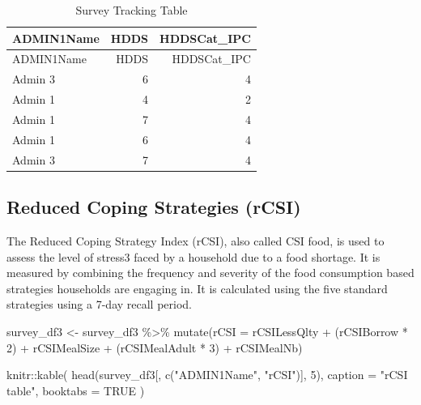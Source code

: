\documentclass[
  letterpaper,
  DIV=11,
  numbers=noendperiod]{scrreprt}
\newenvironment{Shaded}{\begin{snugshade}}{\end{snugshade}}
\newcommand{\AttributeTok}[1]{\textcolor[rgb]{0.40,0.45,0.13}{#1}}
\newcommand{\ConstantTok}[1]{\textcolor[rgb]{0.56,0.35,0.01}{#1}}
\newcommand{\DecValTok}[1]{\textcolor[rgb]{0.68,0.00,0.00}{#1}}
\newcommand{\FunctionTok}[1]{\textcolor[rgb]{0.28,0.35,0.67}{#1}}
\newcommand{\NormalTok}[1]{\textcolor[rgb]{0.00,0.23,0.31}{#1}}
\newcommand{\OtherTok}[1]{\textcolor[rgb]{0.00,0.23,0.31}{#1}}
\newcommand{\SpecialCharTok}[1]{\textcolor[rgb]{0.37,0.37,0.37}{#1}}
\newcommand{\StringTok}[1]{\textcolor[rgb]{0.13,0.47,0.30}{#1}}
\begin{document}
\begin{longtable}[]{@{}lrr@{}}
\caption{Survey Tracking Table}\tabularnewline
\toprule\noalign{}
ADMIN1Name & HDDS & HDDSCat\_IPC \\
\midrule\noalign{}
\endfirsthead
\toprule\noalign{}
ADMIN1Name & HDDS & HDDSCat\_IPC \\
\midrule\noalign{}
\endhead
\bottomrule\noalign{}
\endlastfoot
Admin 3 & 6 & 4 \\
Admin 1 & 4 & 2 \\
Admin 1 & 7 & 4 \\
Admin 1 & 6 & 4 \\
Admin 3 & 7 & 4 \\
\end{longtable}

\hypertarget{reduced-coping-strategies-rcsi}{%
\subsection{Reduced Coping Strategies
(rCSI)}\label{reduced-coping-strategies-rcsi}}

The Reduced Coping Strategy Index (rCSI), also called CSI food, is used
to assess the level of stress3 faced by a household due to a food
shortage. It is measured by combining the frequency and severity of the
food consumption based strategies households are engaging in. It is
calculated using the five standard strategies using a 7-day recall
period.

\begin{Shaded}
\begin{Highlighting}[]
\NormalTok{survey\_df3 }\OtherTok{\textless{}{-}}\NormalTok{ survey\_df3 }\SpecialCharTok{\%\textgreater{}\%} 
  \FunctionTok{mutate}\NormalTok{(}\AttributeTok{rCSI =}\NormalTok{ rCSILessQlty }\SpecialCharTok{+}\NormalTok{ (rCSIBorrow }\SpecialCharTok{*} \DecValTok{2}\NormalTok{) }\SpecialCharTok{+}\NormalTok{ rCSIMealSize }\SpecialCharTok{+}\NormalTok{ (rCSIMealAdult }\SpecialCharTok{*} \DecValTok{3}\NormalTok{) }\SpecialCharTok{+}\NormalTok{ rCSIMealNb)}
\end{Highlighting}
\end{Shaded}

\begin{Shaded}
\begin{Highlighting}[]
\NormalTok{knitr}\SpecialCharTok{::}\FunctionTok{kable}\NormalTok{(}
  \FunctionTok{head}\NormalTok{(survey\_df3[, }\FunctionTok{c}\NormalTok{(}\StringTok{"ADMIN1Name"}\NormalTok{, }\StringTok{"rCSI"}\NormalTok{)], }\DecValTok{5}\NormalTok{),}
  \AttributeTok{caption =} \StringTok{"rCSI table"}\NormalTok{,}
  \AttributeTok{booktabs =} \ConstantTok{TRUE}
\NormalTok{)}
\end{Highlighting}
\end{Shaded}
\end{document}
